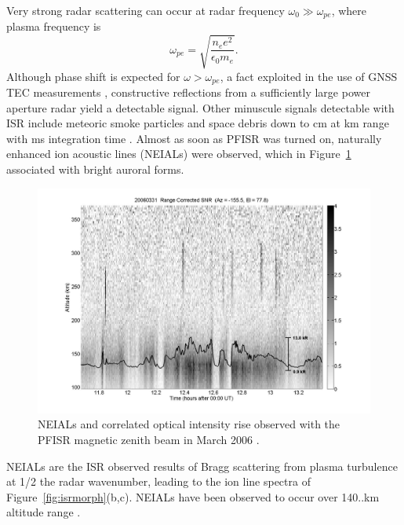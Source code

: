 Very strong radar scattering can occur at radar frequency $\omega_0 \gg \omega_{pe}$, where plasma frequency is \citep{langmuir1928,chenbook}
\begin{equation}\label{eq:wpe}
\omega_{pe} = \sqrt{\frac{n_e e^2}{\epsilon_0 m_e}}.
\end{equation}
Although phase shift is expected for $\omega > \omega_{pe}$, a fact exploited in the use of GNSS TEC measurements \citep{coster1992}, constructive reflections from a sufficiently large power aperture radar yield a detectable signal.
Other minuscule signals detectable with ISR include meteoric smoke particles \citep{mahmoudian2017,baumann2016,hsu2011} and space debris down to \unit[3]{cm} at \unit[1000]{km} range with \unit[100]{ms} integration time \citep{nicolls2015}.
Almost as soon as PFISR was turned on, naturally enhanced ion acoustic lines (NEIALs) were observed, which \citet{michell2008} in Figure~\ref{fig:firstpfisrneials} associated with bright auroral forms.
\begin{figure}
	\includegraphics[width=\linewidth]{gfx/pfisrfirstneials}
	\caption{NEIALs and correlated optical intensity rise observed with the PFISR magnetic zenith beam in March 2006 \citep{michell2008}.}
	\label{fig:firstpfisrneials} 
\end{figure}
NEIALs are the ISR observed results of Bragg scattering from plasma turbulence at 1/2 the radar wavenumber, leading to the ion line spectra of Figure~\ref{fig:isrmorph}(b,c).
NEIALs have been observed to occur over 140..\unit[1900]{km} altitude range \citep{schlatter2013}.











